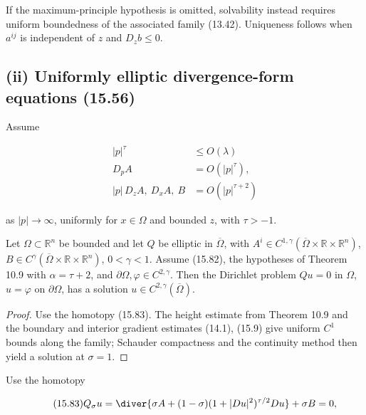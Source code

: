 If the maximum-principle hypothesis is omitted, solvability instead requires
uniform boundedness of the associated family (13.42). Uniqueness follows when
\(a^{ij}\) is independent of \(z\) and \(D_zb\le0\).

\medskip

\subsection*{(ii) Uniformly elliptic divergence-form equations (15.56)}
Assume

\begin{equation}\tag{15.82}
\begin{aligned}
|p|^\tau &\leq O(\lambda)\\
D_p A &= O(|p|^\tau),\\
|p|\,D_z A,\ D_x A,\ B &= O(|p|^{\tau+2})
\end{aligned}
\end{equation}

as \(|p|\to\infty\), uniformly for \(x\in\Omega\) and bounded \(z\), with \(\tau>-1\).

\medskip

\begin{theorem}\label{gilbarg-trudinger.thm.15.11.divergence-existence}
Let \(\Omega\subset\mathbb R^n\) be bounded and let \(Q\) be elliptic in
\(\overline\Omega\), with \(A^i\in C^{1,\gamma}(\overline\Omega\times\mathbb R\times\mathbb R^n)\),
\(B\in C^\gamma(\overline\Omega\times\mathbb R\times\mathbb R^n)\), \(0<\gamma<1\).
Assume (15.82), the hypotheses of Theorem 10.9 with \(\alpha=\tau+2\), and
\(\partial\Omega,\varphi\in C^{2,\gamma}\). Then the Dirichlet problem
\(Qu=0\) in \(\Omega\), \(u=\varphi\) on \(\partial\Omega\), has a solution
\(u\in C^{2,\gamma}(\overline\Omega)\).
\end{theorem}
\begin{proof}
\sketch Use the homotopy (15.83). The height estimate from Theorem 10.9 and
the boundary and interior gradient estimates (14.1), (15.9) give uniform
\(C^1\) bounds along the family; Schauder compactness and the continuity method
then yield a solution at \(\sigma=1\).
\end{proof}

\medskip

Use the homotopy

\begin{equation}\tag{15.83}
Q_\sigma u=\diver\{\sigma A+(1-\sigma)(1+|Du|^2)^{\tau/2}Du\}+\sigma B=0,
\end{equation}

